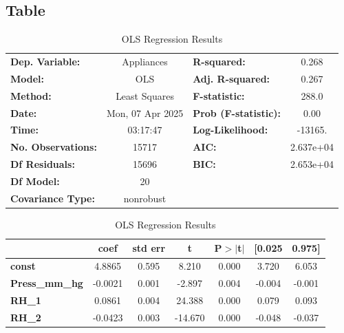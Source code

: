 \subsection{Table}
\begin{center}
\begin{table}[!h]
    \centering
    \caption{OLS Regression Results}
    \label{tab:linear_regression}
    \begin{tabular}{lclc}
    \toprule
    \textbf{Dep. Variable:}    &    Appliances    & \textbf{  R-squared:         } &     0.268   \\
    \textbf{Model:}            &       OLS        & \textbf{  Adj. R-squared:    } &     0.267   \\
    \textbf{Method:}           &  Least Squares   & \textbf{  F-statistic:       } &     288.0   \\
    \textbf{Date:}             & Mon, 07 Apr 2025 & \textbf{  Prob (F-statistic):} &     0.00    \\
    \textbf{Time:}             &     03:17:47     & \textbf{  Log-Likelihood:    } &   -13165.   \\
    \textbf{No. Observations:} &       15717      & \textbf{  AIC:               } & 2.637e+04   \\
    \textbf{Df Residuals:}     &       15696      & \textbf{  BIC:               } & 2.653e+04   \\
    \textbf{Df Model:}         &          20      & \textbf{                     } &             \\
    \textbf{Covariance Type:}  &    nonrobust     & \textbf{                     } &             \\
    \bottomrule
    \end{tabular}
    \begin{tabular}{lcccccc}
                           & \textbf{coef} & \textbf{std err} & \textbf{t} & \textbf{P$> |$t$|$} & \textbf{[0.025} & \textbf{0.975]}  \\
    \midrule
    \textbf{const}         &       4.8865  &        0.595     &     8.210  &         0.000        &        3.720    &        6.053     \\
    \textbf{Press\_mm\_hg} &      -0.0021  &        0.001     &    -2.897  &         0.004        &       -0.004    &       -0.001     \\
    \textbf{RH\_1}         &       0.0861  &        0.004     &    24.388  &         0.000        &        0.079    &        0.093     \\
    \textbf{RH\_2}         &      -0.0423  &        0.003     &   -14.670  &         0.000        &       -0.048    &       -0.037     \\

\end{tabular}
\end{table}
\end{center}
